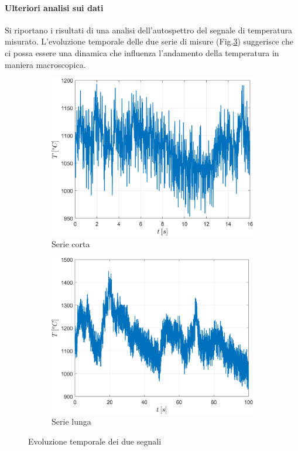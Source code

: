 \paragraph{Ulteriori analisi sui dati}
Si riportano i risultati di una analisi dell'autospettro del segnale di temperatura misurato. L'evoluzione temporale delle due serie di misure (Fig.\ref{fig:timeboth}) suggerisce che ci possa essere una dinamica che influenza l'andamento della temperatura in maniera macroscopica. 

\begin{figure}
	\centering
	\begin{subfigure}{0.5\textwidth}
		\centering
		\includegraphics[width=0.95\linewidth]{"../sperimentazione nei propulsori/time_short"}
		\caption{Serie corta}
		\label{fig:timeshort}
	\end{subfigure}%
\begin{subfigure}{0.5\textwidth}
	\centering
	\includegraphics[width=0.95\linewidth]{"../sperimentazione nei propulsori/time_long"}
	\caption{Serie lunga}
	\label{fig:timelong}
\end{subfigure}
\caption{Evoluzione temporale dei due segnali}
\label{fig:timeboth}
\end{figure}

